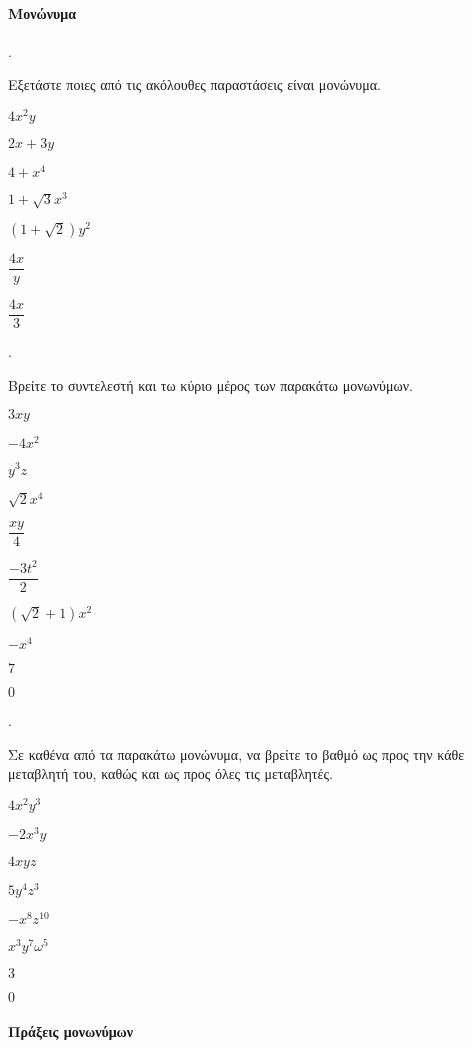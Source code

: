 \documentclass[11pt,a4paper,twocolumn]{article}
\newcounter{askhsh}
\newcommand{\askhsh}{{\large\theaskhsh.}\ \addtocounter{askhsh}{1}}
\begin{document}
\paragraph{Μονώνυμα}
\askhsh Εξετάστε ποιες από τις ακόλουθες παραστάσεις είναι μονώνυμα.
\begin{multicols}{2}
\begin{alist}
\item $4x^2y$
\item $2x+3y$
\item $4+x^4$
\item $1+\sqrt{3}x^3$
\item $\left(1+\sqrt{2}\right)y^2$
\item $\dfrac{4x}{y}$
\item $\dfrac{4x}{3}$
\end{alist}
\end{multicols}
\askhsh Βρείτε το συντελεστή και τω κύριο μέρος των παρακάτω μονωνύμων.
\begin{multicols}{3}
\begin{alist}[leftmargin=7mm]
\item $3xy$
\item $-4x^2$
\item $y^3z$
\item $\sqrt{2}x^4$
\item $\dfrac{xy}{4}$
\item $\dfrac{-3t^2}{2}$
\item $\left(\!\sqrt{2}+1\right)x^2$
\item $-x^4$
\item $7$
\item $0$
\end{alist}
\end{multicols}
\askhsh Σε καθένα από τα παρακάτω μονώνυμα, να βρείτε το βαθμό ως προς την κάθε μεταβλητή του, καθώς και ως προς όλες τις μεταβλητές.
\begin{multicols}{2}
\begin{alist}
\item $4x^2y^3$
\item $-2x^3y$
\item $4xyz$
\item $5y^4z^3$
\item $-x^8z^{10}$
\item $x^3y^7\omega^5$
\item $3$
\item $0$
\end{alist}
\end{multicols}
\paragraph{Πράξεις μονωνύμων}
\end{document}

